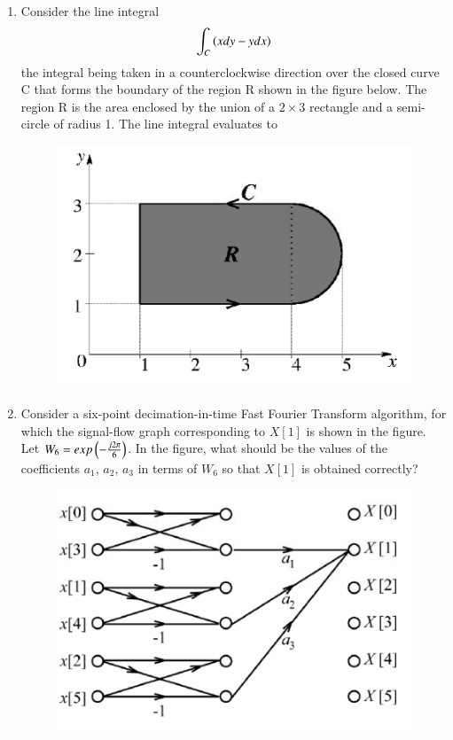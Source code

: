 \documentclass[a4paper, 11pt]{article}
\begin{document}
\begin{enumerate}
    \hfill{}
    
    \item Consider the line integral
    \[
    \int_{C}\left(xdy-ydx\right)
    \]
    the integral being taken in a counterclockwise direction over the closed curve C that forms the boundary of the region R shown in the figure below. The region R is the area enclosed by the union of a $2\times3$ rectangle and a semi-circle of radius 1. The line integral evaluates to
    
    \begin{figure}[H]
        \centering
        \includegraphics[width=0.5\columnwidth]{figs/q27.png}
        \caption*{}
        \label{fig:q27}
    \end{figure}
    
    \begin{enumerate}
    \end{enumerate}

    \hfill{}
    
    \item Consider a six-point decimation-in-time Fast Fourier Transform  algorithm, for which the signal-flow graph corresponding to $X[1]$ is shown in the figure. Let $W_{6}=exp\left(-\frac{j2\pi}{6}\right)$. In the figure, what should be the values of the coefficients $a_{1}$, $a_{2}$, $a_{3}$ in terms of $W_{6}$ so that $X[1]$ is obtained correctly?
    
    \begin{figure}[H]
        \centering
        \includegraphics[width=0.8\columnwidth]{figs/q28.png}
        \caption*{}
        \label{fig:q28}
    \end{figure}
    

\end{enumerate}
\end{document}
